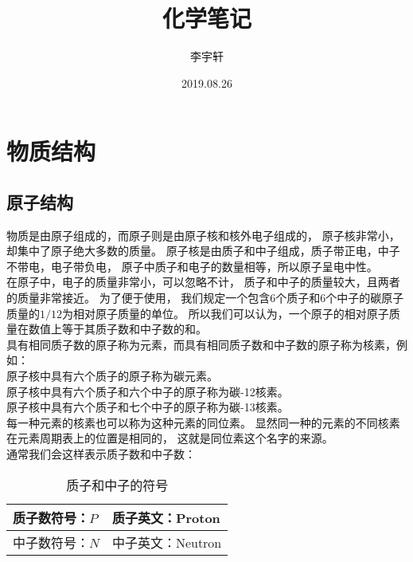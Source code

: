\documentclass[UTF8]{ctexart}
\title{化学笔记}
\author{李宇轩}
\date{2019.08.26}
\begin{document}
\maketitle

\newpage

\tableofcontents

\newpage

\setlength{\parindent}{0pt}

\section{物质结构}

\subsection{原子结构}
    物质是由原子组成的，而原子则是由原子核和核外电子组成的，
    原子核非常小，却集中了原子绝大多数的质量。
    原子核是由质子和中子组成，质子带正电，中子不带电，电子带负电，
    原子中质子和电子的数量相等，所以原子呈电中性。\\[3mm]
    在原子中，电子的质量非常小，可以忽略不计，
    质子和中子的质量较大，且两者的质量非常接近。
    为了便于使用，
    我们规定一个包含$6$个质子和$6$个中子的碳原子质量的$1/12$为相对原子质量的单位。
    所以我们可以认为，一个原子的相对原子质量在数值上等于其质子数和中子数的和。\\[3mm]
    具有相同质子数的原子称为元素，而具有相同质子数和中子数的原子称为核素，例如：\\[3mm]
    原子核中具有六个质子的原子称为碳元素。\\[1mm]
    原子核中具有六个质子和六个中子的原子称为碳-12核素。\\[1mm]
    原子核中具有六个质子和七个中子的原子称为碳-13核素。\\[3mm]
    每一种元素的核素也可以称为这种元素的同位素。
    显然同一种的元素的不同核素在元素周期表上的位置是相同的，
    这就是同位素这个名字的来源。\\[3mm]
    通常我们会这样表示质子数和中子数：
    \begin{table}[h]
        \begin{center}
            \begin{tabular}{l|l}
                \hline
                质子数符号：$P$\qquad\qquad&质子英文：Proton\qquad\qquad\\ \hline
                中子数符号：$N$\qquad\qquad&中子英文：Neutron\qquad\qquad\\ \hline
            \end{tabular}
            \caption{质子和中子的符号}
        \end{center}
    \end{table}\vspace{-20pt}
\end{document}
